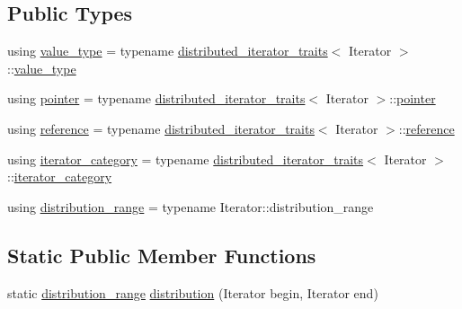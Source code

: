 \subsection*{Public Types}
\begin{DoxyCompactItemize}
\item 
using \hyperlink{structshad_1_1distributed__random__access__iterator__trait_a8b61d58bf5959893ece6c9f38a1acf5d}{value\-\_\-type} = typename \hyperlink{structshad_1_1distributed__iterator__traits}{distributed\-\_\-iterator\-\_\-traits}$<$ Iterator $>$\-::\hyperlink{structshad_1_1distributed__iterator__traits_a67d1c97f6cfbb30068ed30d5fd5ef2bc}{value\-\_\-type}
\item 
using \hyperlink{structshad_1_1distributed__random__access__iterator__trait_aa7a80d89b4f5361c95d2cf7c682dc890}{pointer} = typename \hyperlink{structshad_1_1distributed__iterator__traits}{distributed\-\_\-iterator\-\_\-traits}$<$ Iterator $>$\-::\hyperlink{structshad_1_1distributed__iterator__traits_a3a4ebe1206d3e4d866752f2a3080f699}{pointer}
\item 
using \hyperlink{structshad_1_1distributed__random__access__iterator__trait_a67a58fe073cae4c0f77eb9ea96844bc1}{reference} = typename \hyperlink{structshad_1_1distributed__iterator__traits}{distributed\-\_\-iterator\-\_\-traits}$<$ Iterator $>$\-::\hyperlink{structshad_1_1distributed__iterator__traits_a82276f0370374d079f192c503f21b7a5}{reference}
\item 
using \hyperlink{structshad_1_1distributed__random__access__iterator__trait_a6794da2277108e23065517078bbf8e93}{iterator\-\_\-category} = typename \hyperlink{structshad_1_1distributed__iterator__traits}{distributed\-\_\-iterator\-\_\-traits}$<$ Iterator $>$\-::\hyperlink{structshad_1_1distributed__iterator__traits_ae2c93d2849540657dd1f56c643d75c26}{iterator\-\_\-category}
\item 
using \hyperlink{structshad_1_1distributed__random__access__iterator__trait_a8981d6d76b421929c62efdd94ea806a3}{distribution\-\_\-range} = typename Iterator\-::distribution\-\_\-range
\end{DoxyCompactItemize}
\subsection*{Static Public Member Functions}
\begin{DoxyCompactItemize}
\item 
static \hyperlink{structshad_1_1distributed__random__access__iterator__trait_a8981d6d76b421929c62efdd94ea806a3}{distribution\-\_\-range} \hyperlink{structshad_1_1distributed__random__access__iterator__trait_ac99f0d323413ef3ac676168b00e43cb9}{distribution} (Iterator begin, Iterator end)
\end{DoxyCompactItemize}


